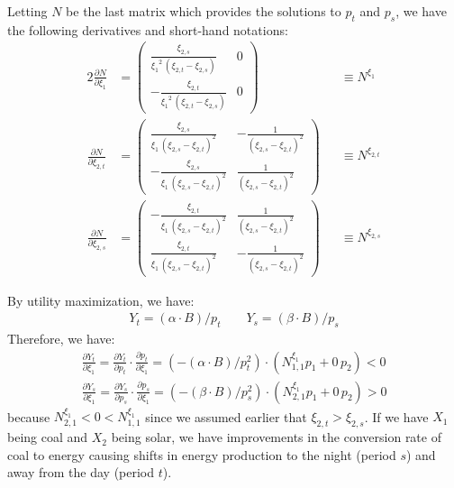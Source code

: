 \documentclass[12pt,a4paper]{extarticle}
\begin{document}
Letting $N$ be the last matrix which provides the solutions to $p_t$ and $p_s$, we have the following derivatives and short-hand notations:
\begin{alignat*}{2}
\frac{\partial N}{\partial \xi_1} &= 
\left(\begin{array}{cc} \frac{\xi _{2,s}}{{\xi _{1}}^2\,\left(\xi _{2,t}-\xi _{2,s}\right)} & 0\\ -\frac{\xi _{2,t}}{{\xi _{1}}^2\,\left(\xi _{2,t}-\xi _{2,s}\right)} & 0 \end{array}\right)
&&\equiv N^{\xi_1} \\
\frac{\partial N}{\partial \xi_{2,t}} &=
\left(\begin{array}{cc} \frac{\xi _{2,s}}{\xi _{1}\,{\left(\xi _{2,s}-\xi _{2,t}\right)}^2} & -\frac{1}{{\left(\xi _{2,s}-\xi _{2,t}\right)}^2}\\ -\frac{\xi _{2,s}}{\xi _{1}\,{\left(\xi _{2,s}-\xi _{2,t}\right)}^2} & \frac{1}{{\left(\xi _{2,s}-\xi _{2,t}\right)}^2} \end{array}\right)
&&\equiv N^{\xi_{2,t}} \\
\frac{\partial N}{\partial \xi_{2,s}} &=
\left(\begin{array}{cc} -\frac{\xi _{2,t}}{\xi _{1}\,{\left(\xi _{2,s}-\xi _{2,t}\right)}^2} & \frac{1}{{\left(\xi _{2,s}-\xi _{2,t}\right)}^2}\\ \frac{\xi _{2,t}}{\xi _{1}\,{\left(\xi _{2,s}-\xi _{2,t}\right)}^2} & -\frac{1}{{\left(\xi _{2,s}-\xi _{2,t}\right)}^2} \end{array}\right)
&&\equiv N^{\xi_{2,s}} 
\end{alignat*}

By utility maximization, we have:
\begin{align*}
Y_t = (\alpha \cdot B)/p_t \qquad Y_s = (\beta \cdot B)/p_s 
\end{align*}
Therefore, we have:
\begin{align*}
\frac{\partial Y_t}{\partial \xi_1} = \frac{\partial Y_t}{\partial p_t}  \cdot \frac{\partial p_t}{\partial \xi_1} = (-(\alpha \cdot B)/p_t^2) \cdot (N^{\xi_1}_{1,1} p_1 + 0 \, p_2) < 0 \\
\frac{\partial Y_s}{\partial \xi_1} = \frac{\partial Y_s}{\partial p_s}  \cdot \frac{\partial p_s}{\partial \xi_1} = (-(\beta \cdot B)/p_s^2) \cdot (N^{\xi_1}_{2,1} p_1 + 0 \, p_2) > 0 
\end{align*}
because $N^{\xi_1}_{2,1} < 0 < N^{\xi_1}_{1,1}$ since we assumed earlier that $\xi_{2,t} > \xi_{2,s}$. If we have $X_1$ being coal and $X_2$ being solar, we have improvements in the conversion rate of coal to energy causing shifts in energy production to the night (period $s$) and away from the day (period $t$). 
\end{document}

